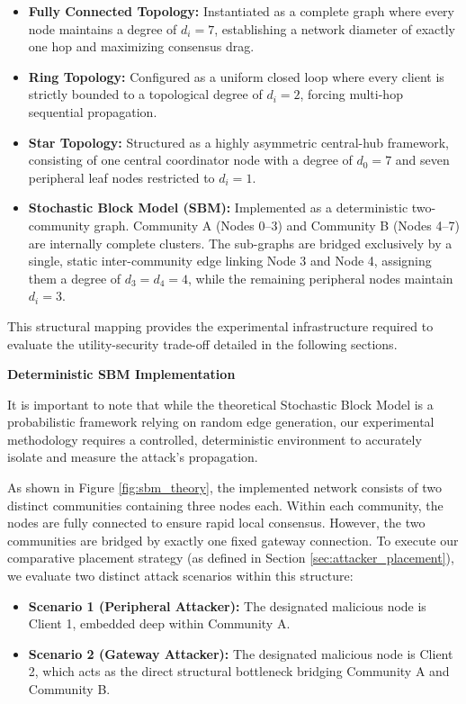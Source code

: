 \begin{itemize}
    \item \textbf{Fully Connected Topology:} Instantiated as a complete graph where every node maintains a degree of $d_i = 7$, establishing a network diameter of exactly one hop and maximizing consensus drag.
    \item \textbf{Ring Topology:} Configured as a uniform closed loop where every client is strictly bounded to a topological degree of $d_i = 2$, forcing multi-hop sequential propagation.
    \item \textbf{Star Topology:} Structured as a highly asymmetric central-hub framework, consisting of one central coordinator node with a degree of $d_0 = 7$ and seven peripheral leaf nodes restricted to $d_i = 1$.
    \item \textbf{Stochastic Block Model (SBM):} Implemented as a deterministic two-community graph. Community A (Nodes 0--3) and Community B (Nodes 4--7) are internally complete clusters. The sub-graphs are bridged exclusively by a single, static inter-community edge linking Node 3 and Node 4, assigning them a degree of $d_3 = d_4 = 4$, while the remaining peripheral nodes maintain $d_i = 3$.
\end{itemize}
This structural mapping provides the experimental infrastructure required to evaluate the utility-security trade-off detailed in the following sections.


\textbf{Deterministic SBM Implementation}

It is important to note that while the theoretical Stochastic Block Model \cite{holland1983stochastic} is a probabilistic framework relying on random edge generation, our experimental methodology requires a controlled, deterministic environment to accurately isolate and measure the attack's propagation.

As shown in Figure \ref{fig:sbm_theory}, the implemented network consists of two distinct communities containing three nodes each. Within each community, the nodes are fully connected to ensure rapid local consensus. However, the two communities are bridged by exactly one fixed gateway connection. To execute our comparative placement strategy (as defined in Section \ref{sec:attacker_placement}), we evaluate two distinct attack scenarios within this structure:

\begin{itemize}
    \item \textbf{Scenario 1 (Peripheral Attacker):} The designated malicious node is Client 1, embedded deep within Community A.
    \item \textbf{Scenario 2 (Gateway Attacker):} The designated malicious node is Client 2, which acts as the direct structural bottleneck bridging Community A and Community B.
\end{itemize}

